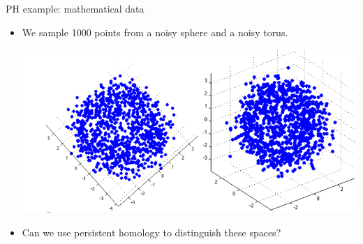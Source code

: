 \documentclass[usenames,dvipsnames,aspectratio=1610]{beamer}
\begin{document}
\begin{frame}{PH example: mathematical data}
  \begin{itemize}
    \item We sample 1000 points from a noisy sphere and a noisy torus.
      \begin{center}
	\includegraphics[scale=0.5]{images/sphere_tor.png}
      \end{center}
    \item Can we use persistent homology to distinguish these spaces?
  \end{itemize}
\end{frame}
\end{document}
